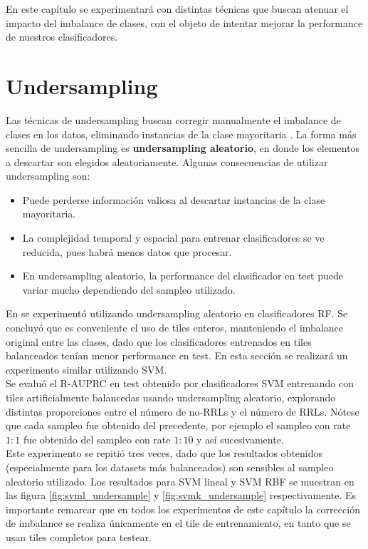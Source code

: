 En este capítulo se experimentará con distintas técnicas que buscan atenuar el impacto del imbalance de clases, con el objeto de intentar mejorar la performance de nuestros clasificadores.

\section{Undersampling}
Las técnicas de undersampling buscan corregir manualmente el imbalance de clases en los datos, eliminando instancias de la clase mayoritaria \cite{nathalie} \cite{he}. La forma más sencilla de undersampling es \textbf{undersampling aleatorio}, en donde los elementos a descartar son elegidos aleatoriamente. Algunas consecuencias de utilizar undersampling son:

\begin{itemize}
\item Puede perderse información valiosa al descartar instancias de la clase mayoritaria.
\item La complejidad temporal y espacial para entrenar clasificadores se ve reducida, pues habrá menos datos que procesar.
\item En undersampling aleatorio, la performance del clasificador en test puede variar mucho dependiendo del sampleo utilizado.
\end{itemize}

En \cite{jbc} se experimentó utilizando undersampling aleatorio en clasificadores RF. Se concluyó que es conveniente el uso de tiles enteros, manteniendo el imbalance original entre las clases, dado que los clasificadores entrenados en tiles balanceados tenían menor performance en test. En esta sección se realizará un experimento similar utilizando SVM. \\

Se evaluó el R-AUPRC en test obtenido por clasificadores SVM entrenando con tiles artificialmente balancedas usando undersampling aleatorio, explorando distintas proporciones entre el número de no-RRLs y el número de RRLs. Nótese que cada sampleo fue obtenido del precedente, por ejemplo el sampleo con rate $1:1$ fue obtenido del sampleo con rate $1:10$ y así sucesivamente. \\

Este experimento se repitió tres veces, dado que los resultados obtenidos (especialmente para los datasets más balanceados) son sensibles al sampleo aleatorio utilizado. Los resultados para SVM lineal y SVM RBF se muestran en las figura \ref{fig:svml_undersample} y \ref{fig:svmk_undersample} respectivamente. Es importante remarcar que en todos los experimentos de este capítulo la corrección de imbalance se realiza únicamente en el tile de entrenamiento, en tanto que se usan tiles completos para testear. \\

